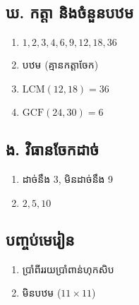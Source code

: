 \begin{multicols}{2}
    \subsection*{ឃ. កត្តា និងចំនួនបឋម}
    \begin{enumerate}[label=\arabic*.]
        \item $1, 2, 3, 4, 6, 9, 12, 18, 36$
        \item បឋម (គ្មានកត្តាចែក)
        \item $\mathrm{LCM}(12,18)=36$
        \item $\mathrm{GCF}(24,30)=6$
    \end{enumerate}

    \subsection*{ង. វិធានចែកដាច់}
    \begin{enumerate}[label=\arabic*.]
        \item ដាច់នឹង 3, មិនដាច់នឹង 9
        \item $2, 5, 10$
    \end{enumerate}

    \subsection*{បញ្ចប់មេរៀន}
    \begin{enumerate}[label=\arabic*.]
        \item ប្រាំពីររយប្រាំពាន់ហុកសិប
        \item មិនបឋម ($11\times11$)
    \end{enumerate}
\end{multicols}
